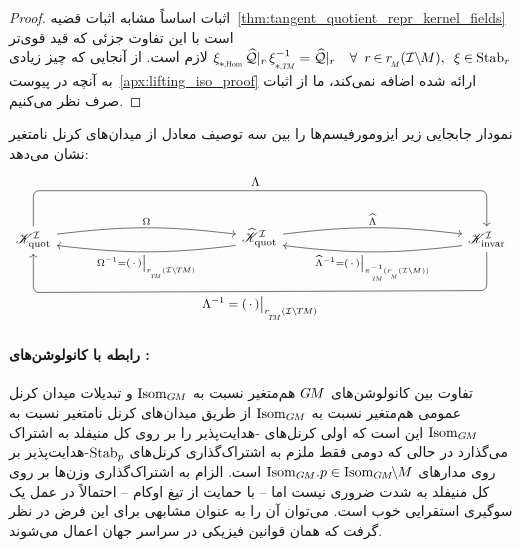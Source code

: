 \begin{proof}
    اثبات اساساً مشابه اثبات قضیه~\ref{thm:tangent_quotient_repr_kernel_fields} است با این تفاوت جزئی که قید قوی‌تر
    $\dxiHom \Qhat|_r\, \dxiTM^{-1} = \Qhat|_r \quad \forall\,\ r \mkern-2mu\in\mkern-1mu \rM(\IM),\,\ \xi \mkern-1mu\in\mkern-1mu \Stab{r}$
    لازم است.
    از آنجایی که چیز زیادی به آنچه در پیوست~\ref{apx:lifting_iso_proof} ارائه شده اضافه نمی‌کند، ما از اثبات صرف نظر می‌کنیم.
\end{proof}

نمودار جابجایی زیر ایزومورفیسم‌ها را بین سه توصیف معادل از میدان‌های کرنل نامتغیر نشان می‌دهد:
\begin{equation}
    \begin{tikzcd}[row sep=3.5em, column sep=13.em]
        \KIquot
            \arrow[r, bend left=7, shift left=2pt, "\Omega"]
            \arrow[rr, rounded corners, to path={ 
                    -- ([yshift=6.ex]\tikztostart.north) 
                    --node[above, pos=.49]{\small$\Lambda$} ([yshift=6.ex]\tikztotarget.north) 
                    -- (\tikztotarget.north)
                    }]
        &
        \KIquothat
            \arrow[r, bend left=7, shift left=2pt, "\widehat{\Lambda}"]
            \arrow[l, bend left=7, shift left=2pt, "\Omega^{-1} = (\,\cdot\,)\big|_{\rTM(\ITM)}"]
        &
        \KIfull
            \arrow[l, bend left=7, shift left=2pt, "\widehat{\Lambda}^{-1} = (\,\cdot\,)\big|_{\piTM^{-1}(\rM(\IM))}"]
            \arrow[ll, rounded corners, to path={ 
                    -- ([yshift=-6.5ex]\tikztostart.south) 
                    --node[below, pos=.5]{\small$\Lambda^{-1} = (\,\cdot\,)\big|_{\rTM(\ITM)}$} ([yshift=-6.5ex]\tikztotarget.south) 
                    -- (\tikztotarget.south)
                    }]
    \end{tikzcd}
\end{equation}










\paragraph{رابطه با کانولوشن‌های :}

تفاوت بین کانولوشن‌های $G\mkern-1.4muM$ هم‌متغیر نسبت به $\operatorname{Isom}_{G\mkern-1.4muM}$ و تبدیلات میدان کرنل عمومی هم‌متغیر نسبت به $\operatorname{Isom}_{G\mkern-1.4muM}$ از طریق میدان‌های کرنل نامتغیر نسبت به $\operatorname{Isom}_{G\mkern-1.4muM}$ این است که اولی کرنل‌های -هدایت‌پذیر را بر روی کل منیفلد به اشتراک می‌گذارد در حالی که دومی فقط ملزم به اشتراک‌گذاری کرنل‌های $\operatorname{Stab}_{p}$-هدایت‌پذیر بر روی مدارهای $\IsomGM\!.p \in \IsomGMM$ است.
الزام به اشتراک‌گذاری وزن‌ها بر روی کل منیفلد به شدت ضروری نیست اما -- با حمایت از تیغ اوکام -- احتمالاً در عمل یک سوگیری استقرایی خوب است.
می‌توان آن را به عنوان مشابهی برای این فرض در نظر گرفت که همان قوانین فیزیکی در سراسر جهان اعمال می‌شوند.


